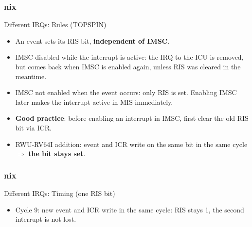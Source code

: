 \documentclass{beamer}
\newcommand{\astitle}{nix}
\newcommand{\assubtitle}{nix}
\newcommand{\wlabel}[2]{\node[anchor=east,font=\tiny] at (0,#1+0.2) {#2};}
\newcommand{\wgrid}[1]{\foreach \t in {0,...,#1} \draw[very thin,lightgray] (\t,-0.2) -- (\t,6.2);}
\begin{document}
\renewcommand{\assubtitle}{Different IRQs: Rules (TOPSPIN)}
\begin{frame}
\frametitle{\astitle}
\begin{block}{\assubtitle}
  \begin{itemize}
    \item An event sets its RIS bit, \textbf{independent of IMSC}.
    \item IMSC disabled while the interrupt is active: the IRQ to the ICU is
      removed, but comes back when IMSC is enabled again, unless RIS was cleared
      in the meantime.
    \item IMSC not enabled when the event occurs: only RIS is set. Enabling IMSC
      later makes the interrupt active in MIS immediately.
    \item \textbf{Good practice}: before enabling an interrupt in IMSC, first clear
      the old RIS bit via ICR.
    \item RWU-RV64I addition: event and ICR write on the same bit in the same
      cycle $\Rightarrow$ \textbf{the bit stays set}.
  \end{itemize}
\end{block}
\end{frame}

\renewcommand{\assubtitle}{Different IRQs: Timing (one RIS bit)}
\begin{frame}
\frametitle{\astitle}
\begin{block}{\assubtitle}
\centering
{}
\end{block}
  \begin{itemize}
    \item Cycle 9: new event and ICR write in the same cycle: RIS stays 1,
      the second interrupt is not lost.
  \end{itemize}
\end{frame}
\end{document}
